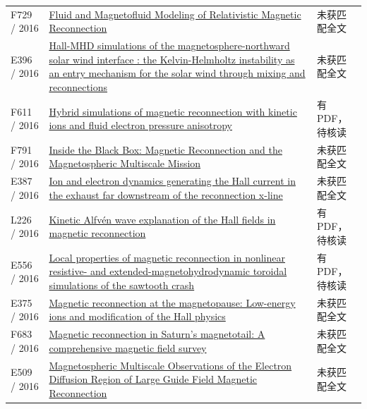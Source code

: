 \begin{longtable}{P{24mm}P{97mm}P{27mm}}
F729 / 2016 & \href{http://citeseerx.ist.psu.edu/viewdoc/summary?doi=10.1.1.743.7627}{Fluid and Magnetofluid Modeling of Relativistic Magnetic Reconnection} & 未获匹配全文\\

E396 / 2016 & \href{https://ui.adsabs.harvard.edu/abs/2016EGUGA..18.9105L/abstract}{Hall-MHD simulations of the magnetosphere-northward solar wind interface : the Kelvin-Helmholtz instability as an entry mechanism for the solar wind through mixing and reconnections} & 未获匹配全文\\

F611 / 2016 & \href{https://doi.org/10.1063/1.4943893}{Hybrid simulations of magnetic reconnection with kinetic ions and fluid electron pressure anisotropy} & 有PDF，待核读\\

F791 / 2016 & \href{https://doi.org/10.1002/2015sw001313}{Inside the Black Box: Magnetic Reconnection and the Magnetospheric Multiscale Mission} & 未获匹配全文\\

E387 / 2016 & \href{https://doi.org/10.1063/1.4940322}{Ion and electron dynamics generating the Hall current in the exhaust far downstream of the reconnection x-line} & 未获匹配全文\\

L226 / 2016 & \href{https://doi.org/10.1002/2016gl071044}{Kinetic Alfvén wave explanation of the Hall fields in magnetic reconnection} & 有PDF，待核读\\

E556 / 2016 & \href{https://doi.org/10.1088/1361-6587/59/2/025007}{Local properties of magnetic reconnection in nonlinear resistive- and extended-magnetohydrodynamic toroidal simulations of the sawtooth crash} & 有PDF，待核读\\

E375 / 2016 & \href{https://ui.adsabs.harvard.edu/abs/2016EGUGA..1813235A/abstract}{Magnetic reconnection at the magnetopause: Low-energy ions and modification of the Hall physics} & 未获匹配全文\\

F683 / 2016 & \href{https://doi.org/10.1002/2015ja022005}{Magnetic reconnection in Saturn's magnetotail: A comprehensive magnetic field survey} & 未获匹配全文\\

E509 / 2016 & \href{https://doi.org/10.1103/physrevlett.117.015001}{Magnetospheric Multiscale Observations of the Electron Diffusion Region of Large Guide Field Magnetic Reconnection} & 未获匹配全文\\


\end{longtable}
